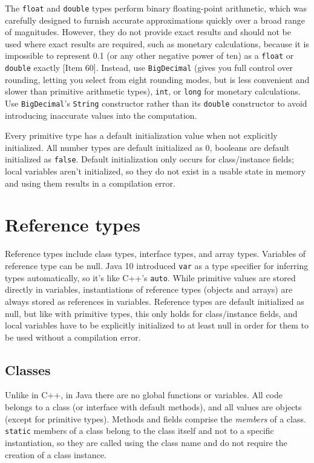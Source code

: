 \documentclass[8pt, table, xcdraw]{article}%
\begin{document}
The \lstinline{float} and \lstinline{double} types perform binary floating-point arithmetic, which was carefully designed to furnish accurate approximations quickly over a broad range of magnitudes. However, they do not provide exact results and should not be used where exact results are required, such as monetary calculations, because it is impossible to represent 0.1 (or any other negative power of ten) as a \lstinline{float} or \lstinline{double} exactly [Item 60]. Instead, use \lstinline{BigDecimal} (gives you full control over rounding, letting you select from eight rounding modes, but is less convenient and slower than primitive arithmetic types), \lstinline{int}, or \lstinline{long} for monetary calculations. Use \lstinline{BigDecimal}’s \lstinline{String} constructor rather than its \lstinline{double} constructor to avoid introducing inaccurate values into the computation.

Every primitive type has a default initialization value when not explicitly initialized. All number types are default initialized as 0, booleans are default initialized as \lstinline{false}. Default initialization only occurs for class/instance fields; local variables aren't initialized, so they do not exist in a usable state in memory and using them results in a compilation error.

\section{Reference types}

Reference types include class types, interface types, and array types. Variables of reference type can be null. Java 10 introduced \lstinline{var} as a type specifier for inferring types automatically, so it's like C++'s \lstinline{auto}. While primitive values are stored directly in variables, instantiations of reference types (objects and arrays) are always stored as references in variables. Reference types are default initialized as null, but like with primitive types, this only holds for class/instance fields, and local variables have to be explicitly initialized to at least null in order for them to be used without a compilation error.

\subsection{Classes}

Unlike in C++, in Java there are no global functions or variables. All code belongs to a class (or interface with default methods), and all values are objects (except for primitive types). Methods and fields comprise the \emph{members} of a class. \lstinline{static} members of a class belong to the class itself and not to a specific instantiation, so they are called using the class name and do not require the creation of a class instance.
\end{document}
